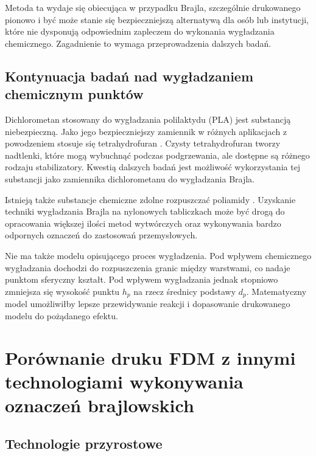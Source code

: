 \documentclass[12pt,a4paper]{article}
\begin{document}
Metoda ta wydaje się obiecująca w przypadku Brajla, szczególnie drukowanego pionowo i być może stanie się bezpieczniejszą alternatywą dla osób lub instytucji, które nie dysponują odpowiednim zapleczem do wykonania wygładzania chemicznego. Zagadnienie to wymaga przeprowadzenia dalszych badań.

\subsection{Kontynuacja badań nad wygładzaniem chemicznym punktów}
Dichlorometan stosowany do wygładzania polilaktydu (PLA) jest substancją niebezpieczną. Jako jego bezpieczniejszy zamiennik w różnych aplikacjach z powodzeniem stosuje się tetrahydrofuran \cite{thf}.
Czysty tetrahydrofuran tworzy nadtlenki, które mogą wybuchnąć podczas podgrzewania, ale dostępne są różnego rodzaju stabilizatory. Kwestią dalszych badań jest możliwość wykorzystania tej substancji jako zamiennika dichlorometanu do wygładzania Brajla.

Istnieją także substancje chemiczne zdolne rozpuszczać poliamidy \cite{pa}. Uzyskanie techniki wygładzania Brajla na nylonowych tabliczkach może być drogą do opracowania większej ilości metod wytwórczych oraz wykonywania bardzo odpornych oznaczeń do zastosowań przemysłowych.

Nie ma także modelu opisującego proces wygładzenia. Pod wpływem chemicznego wygładzania dochodzi do rozpuszczenia granic między warstwami, co nadaje punktom sferyczny kształt. Pod wpływem wygładzania jednak stopniowo zmniejsza się wysokość punktu $h_p$ na rzecz średnicy podstawy $d_p$.
Matematyczny model umożliwiłby lepsze przewidywanie reakcji i dopasowanie drukowanego modelu do pożądanego efektu.

\section{Porównanie druku FDM z innymi technologiami wykonywania oznaczeń brajlowskich}
\label{sec:comparison}
\subsection{Technologie przyrostowe}
\end{document}
